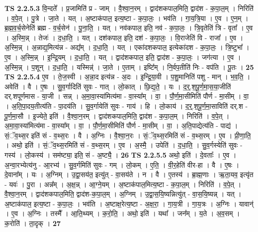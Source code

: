 \documentclass[17pt]{extarticle}
\begin{document}
                  \newline
                                \textbf{ TS 2.2.5.3} \newline
                  वि॒न्दते᳚ । प्र॒जामिति॑ प्र - जाम् । वै॒श्वा॒न॒रम् । द्वाद॑शकपाल॒मिति॒ द्वाद॑श - क॒पा॒ल॒म् । निरिति॑ । व॒पे॒त् । पु॒त्रे । जा॒ते । यत् । अ॒ष्टाक॑पाल॒ इत्य॒ष्टा - क॒पा॒लः॒ । भव॑ति । गा॒य॒त्रि॒या । ए॒व । ए॒न॒म् । ब्र॒ह्म॒व॒र्च॒सेनेति॑ ब्रह्म - व॒र्च॒सेन॑ । पु॒ना॒ति॒ । यत् । नव॑कपाल॒ इति॒ नव॑ - क॒पा॒लः॒ । त्रि॒वृतेति॑ त्रि - वृता᳚ । ए॒व । अ॒स्मि॒न्न् । तेजः॑ । द॒धा॒ति॒ । यत् । दश॑कपाल॒ इति॒ दश॑ - क॒पा॒लः॒ । वि॒राजेति॑ वि - राजा᳚ । ए॒व । अ॒स्मि॒न्न् । अ॒न्नाद्य॒मित्य॑न्न - अद्य᳚म् । द॒धा॒ति॒ । यत् । एका॑दशकपाल॒ इत्येका॑दश - क॒पा॒लः॒ । त्रि॒ष्टुभा᳚ । ए॒व । अ॒स्मि॒न्न् । इ॒न्द्रि॒यम् । द॒धा॒ति॒ । यत् । द्वाद॑शकपाल॒ इति॒ द्वाद॑श - क॒पा॒लः॒ । जग॑त्या । ए॒व । अ॒स्मि॒न्न् । प॒शून् । द॒धा॒ति॒ । यस्मिन्न्॑ । जा॒ते । ए॒ताम् । इष्टि᳚म् । नि॒र्वप॒तीति॑ निः - वप॑ति । पू॒तः । \textbf{  25} \newline
                  \newline
                                \textbf{ TS 2.2.5.4} \newline
                  ए॒व । ते॒ज॒स्वी । अ॒न्ना॒द इत्य॑न्न - अ॒दः । इ॒न्द्रि॒या॒वी । प॒शु॒मानिति॑ पशु - मान् । भ॒व॒ति॒ । अवेति॑ । वै । ए॒षः । सु॒व॒र्गादिति॑ सुवः - गात् । लो॒कात् । छि॒द्य॒ते॒ । यः । द॒र्॒.श॒पू॒र्ण॒मा॒स॒या॒जीति॑ दर्.शपूर्णमास - या॒जी । सन्न् । अ॒मा॒वा॒स्या॑मित्य॑मा - वा॒स्या᳚म् । वा॒ । पौ॒र्ण॒मा॒सीमिति॑ पौर्ण - मा॒सीम् । वा॒ । अ॒ति॒पा॒दय॒तीत्य॑ति - पा॒दय॑ति । सु॒व॒र्गायेति॑ सुवः - गाय॑ । हि । लो॒काय॑ । द॒र्॒.श॒पू॒र्ण॒मा॒साविति॑ दर्.श - पू॒र्ण॒मा॒सौ । इ॒ज्येते॒ इति॑ । वै॒श्वा॒न॒रम् । द्वाद॑शकपाल॒मिति॒ द्वाद॑श - क॒पा॒ल॒म् । निरिति॑ । व॒पे॒त् । अ॒मा॒वा॒स्या॑मित्य॑मा - वा॒स्या᳚म् । वा॒ । पौ॒र्ण॒मा॒सीमिति॑ पौर्ण - मा॒सीम् । वा॒ । अ॒ति॒पाद्येत्य॑ति - पाद्य॑ । सं॒ॅव॒थ्स॒र इति॑ सं - व॒थ्स॒रः । वै । अ॒ग्निः । वै॒श्वा॒न॒रः । सं॒ॅव॒थ्स॒रमिति॑ सं - व॒थ्स॒रम् । ए॒व । प्री॒णा॒ति॒ । अथो॒ इति॑ । सं॒ॅव॒थ्स॒रमिति॑ सं - व॒थ्स॒रम् । ए॒व । अ॒स्मै॒ । उपेति॑ । द॒धा॒ति॒ । सु॒व॒र्गस्येति॑ सुवः - गस्य॑ । लो॒कस्य॑ । सम॑ष्ट्या॒ इति॒ सं - अ॒ष्ट्यै॒ । \textbf{  26} \newline
                  \newline
                                \textbf{ TS 2.2.5.5} \newline
                  अथो॒ इति॑ । दे॒वताः᳚ । ए॒व । अ॒न्वा॒रभ्येत्य॑नु - आ॒रभ्य॑ । सु॒व॒र्गमिति॑ सुवः - गम् । लो॒कम् । ए॒ति॒ । वी॒र॒हेति॑ वीर-हा । वै । ए॒षः । दे॒वाना᳚म् । यः । अ॒ग्निम् । उ॒द्वा॒सय॑त॒ इत्यु॑त् - वा॒सय॑ते । न । वै । ए॒तस्य॑ । ब्रा॒ह्म॒णाः । ऋ॒ता॒यव॒ इत्यृ॑त - यवः॑ । पु॒रा । अन्न᳚म् । अ॒क्ष॒न्न् । आ॒ग्ने॒यम् । अ॒ष्टाक॑पाल॒मित्य॒ष्टा - क॒पा॒ल॒म् । निरिति॑ । व॒पे॒त् । वै॒श्वा॒न॒रम् । द्वाद॑शकपाल॒मिति॒ द्वाद॑श-क॒पा॒ल॒म् । अ॒ग्निम् । उ॒द्वा॒स॒यि॒ष्यन्नित्यु॑त् - वा॒स॒यि॒ष्यन्न् । यत् । अ॒ष्टाक॑पाल॒ इत्य॒ष्टा - क॒पा॒लः॒ । भव॑ति । अ॒ष्टाक्ष॒रेत्य॒ष्टा - अ॒क्ष॒रा॒ । गा॒य॒त्री । गा॒य॒त्रः । अ॒ग्निः । यावान्॑ । ए॒व । अ॒ग्निः । तस्मै᳚ । आ॒ति॒थ्यम् । क॒रो॒ति॒ । अथो॒ इति॑ । यथा᳚ । जन᳚म् । य॒ते । अ॒व॒सम् । क॒रोति॑ । ता॒दृक् । \textbf{  27} \newline
\end{document}
